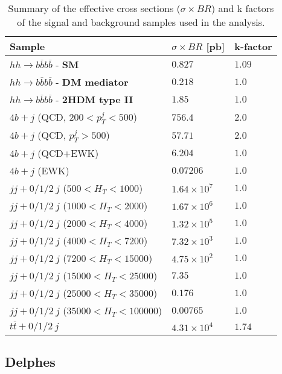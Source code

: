 \begin{table}
	\centering
	\caption{Summary of the effective cross sections ($\sigma\times BR$) and k factors of the signal and background samples used in the analysis.}
	\begin{tabular}{lll}
		\toprule 
		\textbf{Sample} & $\sigma\times BR$ [pb] & k-factor \\
		\midrule
		$hh\rightarrow b\overline{b}b\overline{b}$ - \textbf{SM} & $0.827$ & $1.09$ \\
		\rowcolor{black!7} $hh\rightarrow b\overline{b}b\overline{b}$ - \textbf{DM mediator} & $0.218$ & $1.0$ \\
		$hh\rightarrow b\overline{b}b\overline{b}$ - \textbf{2HDM type II} & $1.85$ & $1.0$ \\
		\rowcolor{black!7} $4b+j$ (QCD, $200<p_T^j<500$)& $756.4$ & $2.0$ \\
		$4b+j$ (QCD, $p_T^j>500$)& $57.71$ & $2.0$ \\
		\rowcolor{black!7}$4b+j$ (QCD+EWK) & $6.204$ & $1.0$ \\
		$4b+j$ (EWK)& $0.07206$ & $1.0$ \\
		\rowcolor{black!7} $jj+0/1/2 ~j$ ($500<H_T<1000$) & $1.64\times 10^7$ &$1.0$\\
		$jj+0/1/2 ~j$ ($1000<H_T<2000$) & $1.67\times 10^6$ &$1.0$ \\
		\rowcolor{black!7}$jj+0/1/2 ~j$ ($2000<H_T<4000$) & $1.32\times 10^5$ & $1.0$\\
		$jj+0/1/2 ~j$ ($4000<H_T<7200$) & $7.32\times 10^3$ & $1.0$\\
		\rowcolor{black!7}$jj+0/1/2 ~j$ ($7200<H_T<15000$) & $4.75\times 10^2$ & $1.0$\\
		$jj+0/1/2 ~j$ ($15000<H_T<25000$) & $7.35$ & $1.0$\\
		\rowcolor{black!7}$jj+0/1/2 ~j$ ($25000<H_T<35000$) & $0.176$ & $1.0$\\
		$jj+0/1/2 ~j$ ($35000<H_T<100000$) & $0.00765$ & $1.0$\\
		\rowcolor{black!7}$t\overline{t}+0/1/2 ~j$ & $4.31	\times 10^4$ & $1.74$ \\
		\bottomrule
	\end{tabular}
	\label{table:samples_summary}
\end{table}

\subsection{Delphes}
\label{sec:HCALgran}

